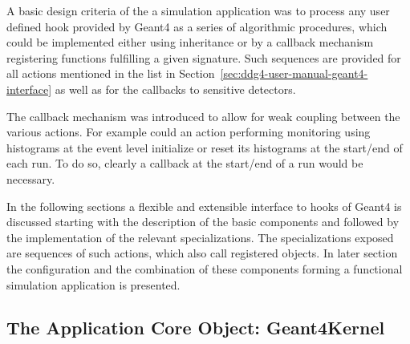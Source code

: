 \documentclass[10pt,a4paper]{article}
\begin{document}
\noindent
A basic design criteria of the a \DDG simulation application was to 
process any user defined hook provided by Geant4 as a series of algorithmic
procedures, which could be implemented either using inheritance or by 
a callback mechanism registering functions fulfilling a given signature.
Such sequences are provided for all actions mentioned in the list in 
Section~\ref{sec:ddg4-user-manual-geant4-interface} as well as for 
the callbacks to sensitive detectors.

\noindent
The callback mechanism was introduced to allow for weak coupling between 
the various actions. For example could an action performing monitoring
using histograms at the event level initialize or reset its histograms
at the start/end of each run. To do so, clearly a callback at the 
start/end of a run would be necessary.

\noindent
In the following sections a flexible and extensible interface to hooks
of Geant4 is discussed starting with the description of the basic
components  and  followed by the 
implementation of the relevant specializations.
The specializations exposed are sequences of such actions,
which also call registered objects.
In later section the configuration and the combination of these components 
forming a functional simulation application is presented.

\subsection{The Application Core Object: Geant4Kernel}
\label{sec:ddg4-user-manual-implementation-geant4kernel}
\end{document}
